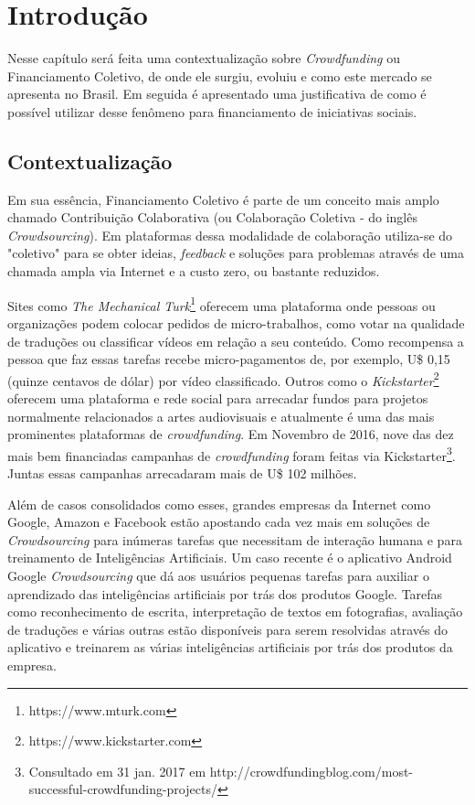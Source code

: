 \chapter{Introdução}

Nesse capítulo será feita uma contextualização sobre \emph{Crowdfunding} ou Financiamento Coletivo, de onde ele surgiu, evoluiu e como este mercado se apresenta no Brasil. Em seguida é apresentado uma justificativa de como é possível utilizar desse fenômeno para financiamento de iniciativas sociais.

\section{Contextualização}
Em sua essência, Financiamento Coletivo é parte de um conceito mais amplo chamado Contribuição Colaborativa (ou Colaboração Coletiva - do inglês \emph{Crowdsourcing}). Em plataformas dessa modalidade de colaboração utiliza-se do "coletivo" para se obter ideias, \emph{feedback} e soluções para problemas através de uma chamada ampla via Internet e a custo zero, ou bastante reduzidos.

Sites como \emph{The Mechanical Turk}\footnote{https://www.mturk.com} oferecem uma plataforma onde pessoas ou organizações podem colocar pedidos de micro-trabalhos, como votar na qualidade de traduções ou classificar vídeos em relação a seu conteúdo. Como recompensa a pessoa que faz essas tarefas recebe micro-pagamentos de, por exemplo, U\$ 0,15 (quinze centavos de dólar) por vídeo classificado. Outros como o \emph{Kickstarter}\footnote{https://www.kickstarter.com} oferecem uma plataforma e rede social para arrecadar fundos para projetos normalmente relacionados a artes audiovisuais e atualmente é uma das mais prominentes plataformas de \emph{crowdfunding}. Em Novembro de 2016, nove das dez mais bem financiadas campanhas de \emph{crowdfunding} foram feitas via Kickstarter\footnote{Consultado em 31 jan. 2017 em http://crowdfundingblog.com/most-successful-crowdfunding-projects/}. Juntas essas campanhas arrecadaram mais de U\$ 102 milhões.

Além de casos consolidados como esses, grandes empresas da Internet como Google, Amazon e Facebook estão apostando cada vez mais em soluções de \emph{Crowdsourcing} para inúmeras tarefas que necessitam de interação humana e para treinamento de Inteligências Artificiais. Um caso recente é o aplicativo Android Google \emph{Crowdsourcing} \cite{cnet-google-crowdsourcing} que dá aos usuários pequenas tarefas para auxiliar o aprendizado das inteligências artificiais por trás dos produtos Google. Tarefas como reconhecimento de escrita, interpretação de textos em fotografias, avaliação de traduções e várias outras estão disponíveis para serem resolvidas através do aplicativo e treinarem as várias inteligências artificiais por trás dos produtos da empresa.

